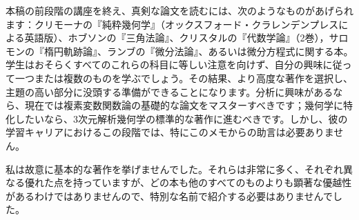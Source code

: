 \documentclass[a4paper,11pt,openany]{ltjsbook}
\begin{document}
本稿の前段階の講座を終え、真剣な論文を読むには、次のようなものがあげられます：クリモーナの『純粋幾何学』（オックスフォード・クラレンデンプレスによる英語版）、ホブソンの『三角法論』、クリスタルの『代数学論』（2巻），サロモンの『楕円軌跡論』、ランブの『微分法論』、あるいは微分方程式に関する本。学生はおそらくすべてのこれらの科目に等しい注意を向けず、自分の興味に従って一つまたは複数のものを学ぶでしょう。その結果、より高度な著作を選択し、主題の高い部分に没頭する準備ができることになります。分析に興味があるなら、現在では複素変数関数論の基礎的な論文をマスターすべきです；幾何学に特化したいなら、3次元解析幾何学の標準的な著作に進むべきです。しかし、彼の学習キャリアにおけるこの段階では、特にこのメモからの助言は必要ありません。

私は故意に基本的な著作を挙げませんでした。それらは非常に多く、それぞれ異なる優れた点を持っていますが、どの本も他のすべてのものよりも顕著な優越性があるわけではありませんので、特別な名前で紹介する必要はありませんでした。
\end{document}
